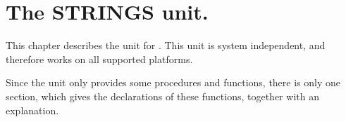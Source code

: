 %
%
%
%
%
\chapter{The STRINGS unit.}
This chapter describes the  unit for \fpc. This unit is system
independent, and therefore works on all supported platforms.

Since the unit only provides some procedures and functions, there is
only one section, which gives the declarations of these functions, together
with an explanation. 
